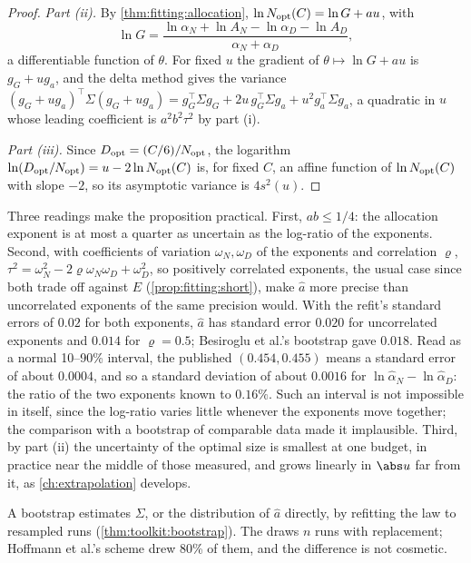 \begin{refsection}
\begin{proof}
\emph{Part (ii).} By \cref{thm:fitting:allocation}, $\ln N_{\mathrm{opt}}(C)=\ln G+au$, with
\[
\ln G=\frac{\ln\alpha_N+\ln A_N-\ln\alpha_D-\ln A_D}{\alpha_N+\alpha_D},
\]
a differentiable function of $\theta$. For fixed $u$ the gradient of $\theta\mapsto\ln G+au$ is $g_G+ug_a$, and the delta method gives the variance $(g_G+ug_a)^\top\Sigma(g_G+ug_a)=g_G^\top\Sigma g_G+2u\,g_G^\top\Sigma g_a+u^2g_a^\top\Sigma g_a$, a quadratic in $u$ whose leading coefficient is $a^2b^2\tau^2$ by part (i).

\emph{Part (iii).} Since $D_{\mathrm{opt}}=(C/6)/N_{\mathrm{opt}}$, the logarithm $\ln(D_{\mathrm{opt}}/N_{\mathrm{opt}})=u-2\ln N_{\mathrm{opt}}(C)$ is, for fixed $C$, an affine function of $\ln N_{\mathrm{opt}}(C)$ with slope $-2$, so its asymptotic variance is $4s^2(u)$.
\end{proof}

Three readings make the proposition practical. First, $ab\le1/4$: the allocation exponent is at most a quarter as uncertain as the log-ratio of the exponents. Second, with coefficients of variation $\omega_N,\omega_D$ of the exponents and correlation $\varrho$, $\tau^2=\omega_N^2-2\varrho\omega_N\omega_D+\omega_D^2$, so positively correlated exponents, the usual case since both trade off against $E$ (\cref{prop:fitting:short}), make $\hat a$ more precise than uncorrelated exponents of the same precision would. With the refit's standard errors of $0.02$ for both exponents, $\hat a$ has standard error $0.020$ for uncorrelated exponents and $0.014$ for $\varrho=0.5$; Besiroglu et al.'s bootstrap gave $0.018$. Read as a normal 10--90\% interval, the published $(0.454,0.455)$ means a standard error of about $0.0004$, and so a standard deviation of about $0.0016$ for $\ln\hat\alpha_N-\ln\hat\alpha_D$: the ratio of the two exponents known to $0.16\%$. Such an interval is not impossible in itself, since the log-ratio varies little whenever the exponents move together; the comparison with a bootstrap of comparable data made it implausible. Third, by part (ii) the uncertainty of the optimal size is smallest at one budget, in practice near the middle of those measured, and grows linearly in $\abs u$ far from it, as \cref{ch:extrapolation} develops.

A bootstrap estimates $\Sigma$, or the distribution of $\hat a$ directly, by refitting the law to resampled runs (\cref{thm:toolkit:bootstrap}). The  draws $n$ runs with replacement; Hoffmann et al.'s scheme drew 80\% of them, and the difference is not cosmetic.


\end{refsection}
